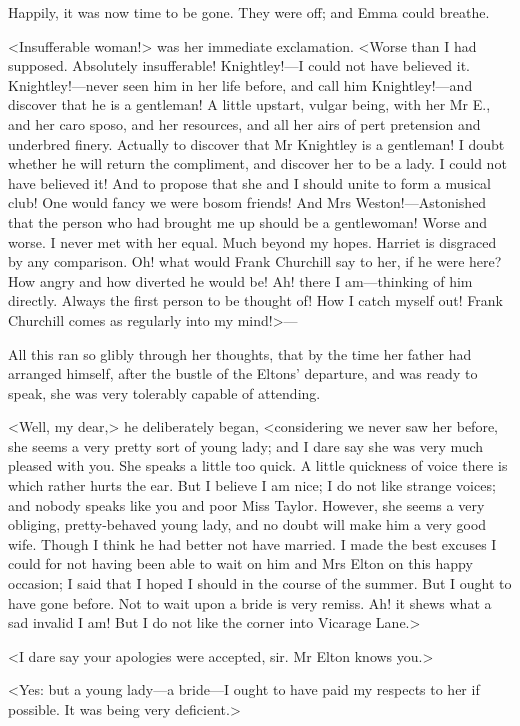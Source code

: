 Happily, it was now time to be gone. They were off; and Emma could breathe.

<Insufferable woman!> was her immediate exclamation. <Worse than I had supposed. Absolutely insufferable! Knightley!—I could not have believed it. Knightley!—never seen him in her life before, and call him Knightley!—and discover that he is a gentleman! A little upstart, vulgar being, with her Mr E., and her caro sposo, and her resources, and all her airs of pert pretension and underbred finery. Actually to discover that Mr Knightley is a gentleman! I doubt whether he will return the compliment, and discover her to be a lady. I could not have believed it! And to propose that she and I should unite to form a musical club! One would fancy we were bosom friends! And Mrs Weston!—Astonished that the person who had brought me up should be a gentlewoman! Worse and worse. I never met with her equal. Much beyond my hopes. Harriet is disgraced by any comparison. Oh! what would Frank Churchill say to her, if he were here? How angry and how diverted he would be! Ah! there I am—thinking of him directly. Always the first person to be thought of! How I catch myself out! Frank Churchill comes as regularly into my mind!>—

All this ran so glibly through her thoughts, that by the time her father had arranged himself, after the bustle of the Eltons' departure, and was ready to speak, she was very tolerably capable of attending.

<Well, my dear,> he deliberately began, <considering we never saw her before, she seems a very pretty sort of young lady; and I dare say she was very much pleased with you. She speaks a little too quick. A little quickness of voice there is which rather hurts the ear. But I believe I am nice; I do not like strange voices; and nobody speaks like you and poor Miss Taylor. However, she seems a very obliging, pretty-behaved young lady, and no doubt will make him a very good wife. Though I think he had better not have married. I made the best excuses I could for not having been able to wait on him and Mrs Elton on this happy occasion; I said that I hoped I should in the course of the summer. But I ought to have gone before. Not to wait upon a bride is very remiss. Ah! it shews what a sad invalid I am! But I do not like the corner into Vicarage Lane.>

<I dare say your apologies were accepted, sir. Mr Elton knows you.>

<Yes: but a young lady—a bride—I ought to have paid my respects to her if possible. It was being very deficient.>

